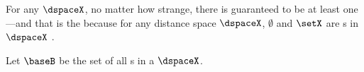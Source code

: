 For any  $\dspaceX$, no matter how strange, 
there is guaranteed to be at least one ---and that 
is the   because for any distance space $\dspaceX$, 
$\emptyset$ and $\setX$ are s in $\dspaceX$ .



\begin{theorem}
\label{thm:baseoball}
Let $\baseB$ be the set of all s in a 
$\dspaceX$. %
\end{theorem}
